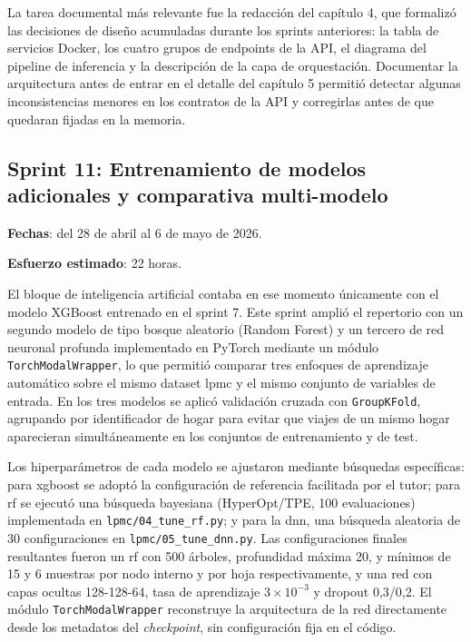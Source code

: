 La tarea documental más relevante fue la redacción del capítulo 4, que formalizó las decisiones de diseño acumuladas durante los sprints anteriores: la tabla de servicios Docker, los cuatro grupos de endpoints de la API, el diagrama del pipeline de inferencia y la descripción de la capa de orquestación. Documentar la arquitectura antes de entrar en el detalle del capítulo 5 permitió detectar algunas inconsistencias menores en los contratos de la API y corregirlas antes de que quedaran fijadas en la memoria.

\subsection{Sprint 11: Entrenamiento de modelos adicionales y comparativa multi-modelo}

\textbf{Fechas}: del 28 de abril al 6 de mayo de 2026.

\textbf{Esfuerzo estimado}: 22 horas.\newline

El bloque de inteligencia artificial contaba en ese momento únicamente con el modelo XGBoost entrenado en el sprint 7. Este sprint amplió el repertorio con un segundo modelo de tipo bosque aleatorio (Random Forest) y un tercero de red neuronal profunda implementado en PyTorch mediante un módulo \texttt{TorchModalWrapper}, lo que permitió comparar tres enfoques de aprendizaje automático sobre el mismo dataset \gls{lpmc} y el mismo conjunto de variables de entrada. En los tres modelos se aplicó validación cruzada con \texttt{GroupKFold}, agrupando por identificador de hogar para evitar que viajes de un mismo hogar aparecieran simultáneamente en los conjuntos de entrenamiento y de test.\newline

Los hiperparámetros de cada modelo se ajustaron mediante búsquedas específicas: para \gls{xgboost} se adoptó la configuración de referencia facilitada por el tutor; para \gls{rf} se ejecutó una búsqueda bayesiana (HyperOpt/TPE, 100 evaluaciones) implementada en \texttt{lpmc/04\_tune\_rf.py}; y para la \gls{dnn}, una búsqueda aleatoria de 30 configuraciones en \texttt{lpmc/05\_tune\_dnn.py}. Las configuraciones finales resultantes fueron un \gls{rf} con 500 árboles, profundidad máxima 20, y mínimos de 15 y 6 muestras por nodo interno y por hoja respectivamente, y una red con capas ocultas 128-128-64, tasa de aprendizaje $3\times10^{-3}$ y dropout 0,3/0,2. El módulo \texttt{TorchModalWrapper} reconstruye la arquitectura de la red directamente desde los metadatos del \textit{checkpoint}, sin configuración fija en el código.\newline

